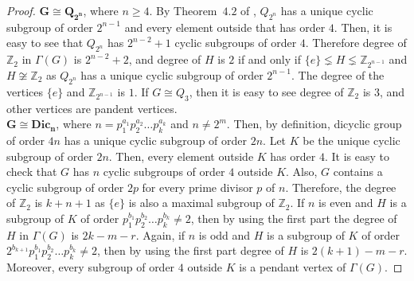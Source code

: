 \documentclass[11pt,twoside]{amsart}
\def \Z {{\mathbb{Z}}}
\begin{document}
\begin{proof}
          $\mathbf{G\cong Q_{2^n}}$, where $n\geq 4$. By Theorem~$4.2$ of \cite{conrad2014generalized}, $Q_{2^n}$ has a unique cyclic subgroup of order $2^{n-1}$ and every element outside that has order $4$. Then, it is easy to see that $Q_{2^n}$ has $2^{n-2}+1$ cyclic subgroups of order $4$. Therefore degree of $\Z_2$ in $\Gamma (G)$ is $2^{n-2}+2$, and degree of $H$ is $2$ if and only if $\{e\}\lneq H\lneq \Z_{2^{n-1}}$ and $H\not \cong \Z_2$ as $Q_{2^n}$ has a unique cyclic subgroup of order $2^{n-1}$. The degree of the vertices $\{e\}$ and $\Z_{2^{n-1}}$ is $1$. If $G\cong Q_3$, then it is easy to see degree of $\Z_2$ is $3$, and other vertices are pandent vertices.\\
          
          $\mathbf{G\cong Dic_n}$, where $n=p_1^{a_1}p_2^{a_2}\dots p_k^{a_k}$ and $n\not =2^m$. Then, by definition, dicyclic group of order $4n$ has a unique cyclic subgroup of order $2n$. Let $K$ be the unique cyclic subgroup of order $2n$. Then, every element outside $K$ has order $4$. It is easy to check that $G$ has $n$ cyclic subgroups of order $4$ outside $K$. Also, $G$ contains a cyclic subgroup of order $2p$ for every prime divisor $p$ of $n$. Therefore, the degree of $\Z_2$ is $k+n+1$ as $\{e\}$ is also a maximal subgroup of $\Z_2$. If $n$ is even and $H$ is a subgroup of $K$ of order $p_1^{b_1}p_2^{b_2}\dots p_k^{b_k}\not =2$, then by using the first part the degree of $H$ in $\Gamma (G)$ is $2k-m-r.$ Again, if $n$ is odd and $H$ is a subgroup of $K$ of order $2^{b_{k+1}}p_1^{b_1}p_2^{b_2}\dots  p_k^{b_k}\not =2$, then by using the first part degree of $H$ is $2(k+1)-m-r.$  Moreover, every subgroup of order $4$ outside $K$ is a pendant vertex of $\Gamma (G).$
   \end{proof}
\end{document}

